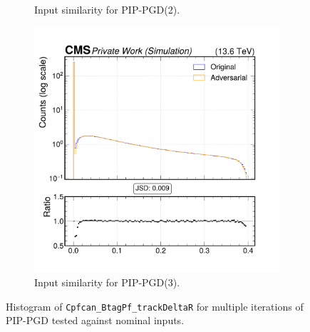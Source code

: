 \begin{figure}[h]
\begin{subfigure}[t]{0.32\textwidth}
    \caption*{Input similarity for PIP-PGD(2).}
  \end{subfigure}\hfill
  \begin{subfigure}[t]{0.32\textwidth}
    \includegraphics[width=\linewidth]{media/output/features/compare/combined_it_3/cmp_cpf_arr_Cpfcan_BtagPf_trackDeltaR.pdf}
    \caption*{Input similarity for PIP-PGD(3).}
  \end{subfigure}

  \caption*{Histogram of \texttt{Cpfcan\_BtagPf\_trackDeltaR} for multiple iterations of PIP-PGD tested against nominal inputs.}
  \label{fig:combined_input_Cpfcan_BtagPf_trackDeltaR}
\end{figure}

